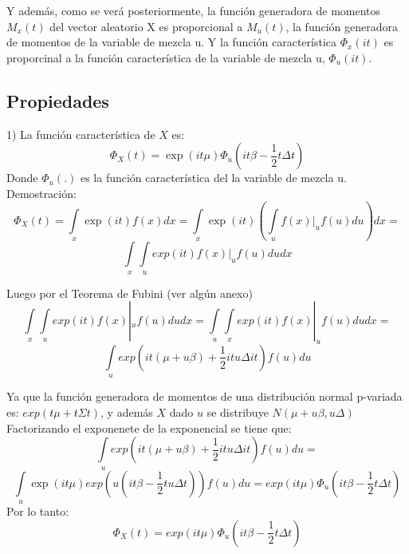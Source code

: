 \documentclass[11pt]{book}
\begin{document}
Y además, como se verá posteriormente, la función generadora de momentos $M_{x}(t)$ del vector aleatorio X es proporcional a $M_{u}(t)$, la función generadora de momentos de la variable de mezcla u. Y la función característica $\Phi_{x}(it)$ es proporcinal a la función característica de la variable de mezcla u, $\Phi_{u}(it)$.\\





\pagebreak
\subsection*{Propiedades}

1) La función característica de $X$ es: 
\begin{equation*}
\Phi_{X}(t)=\exp(it\mu\acute{})\Phi_{u}(it\beta\acute{}-\frac{1}{2}t\Delta t\acute{}) 
\end{equation*}
Donde $\Phi_{u}(.)$ es la función característica del la variable de mezcla u. \\

Demostración:\\
\begin{equation*}
\Phi_{X}(t)=\underset{x}{\int }\exp(it)f(x)dx = \underset{x}{\int }\exp(it)(\underset{u}{\int}f(x)|_{u}f(u)du)dx=
\end{equation*}
\begin{equation*}
\underset{x}{\int}\underset{u}{\int}exp(it)f(x)|_{u}f(u)dudx
\end{equation*}


Luego por el Teorema de Fubini (ver algún anexo)\\
\begin{equation*}
\underset{x}{\int}\underset{u}{\int}exp(it)f(x)|_{u}f(u)dudx=\underset{u}{\int}\underset{x}{\int}exp(it)f(x)|_{u}f(u)dudx=
\end{equation*}
 \begin{equation*}
 \underset{u}{\int}exp(it(\mu+ u\beta)+\frac{1}{2}itu\Delta it)f(u)du
 \end{equation*}
  

Ya que la función generadora de momentos de una distribución normal p-variada es: $exp(t\acute{}\mu + t\acute{}\Sigma t)$, y además $X$ dado $u$ se distribuye $N(\mu + u\beta, u\Delta)$ \\

Factorizando el exponenete de la exponencial se tiene que:\\
\begin{equation*}
\underset{u}{\int}exp(it(\mu+ u\beta)+\frac{1}{2}itu\Delta it)f(u)du=
\end{equation*}
\begin{equation*}
\underset{u}{\int}\exp(it\acute{}\mu)exp(u(it\acute{}\beta -\dfrac{1}{2}t\acute{}u \Delta t))f(u)du = exp(it\acute{}\mu)\Phi_{u}(it\beta-\frac{1}{2}t\Delta t)
\end{equation*}
Por lo tanto: 
\begin{equation*}
\Phi_{X}(t) = exp(it\acute{}\mu)\Phi_{u}(it\beta-\frac{1}{2}t\Delta t)
\end{equation*}
\end{document}
